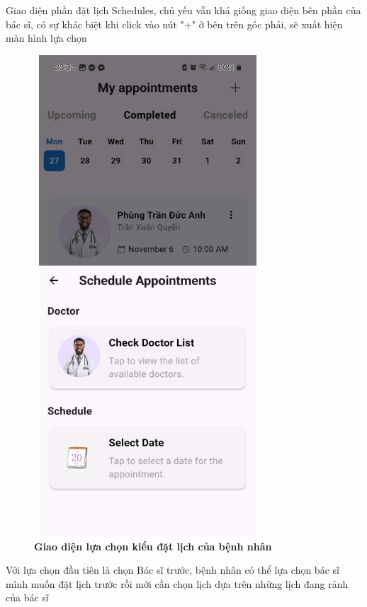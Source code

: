 	Giao diện phần đặt lịch Schedules, chủ yếu vẫn khá giống giao diện bên phần của bác sĩ, có sự khác biệt khi click vào nút "+" ở bên trên góc phải, sẽ xuất hiện màn hình lựa chọn
\begin{figure}[H]
		\centering
		\includegraphics[width=8.5cm,height=18cm]{Images/AppUI/scheduleChoice.jpg}
		\caption[Giao diện lựa chọn kiểu đặt lịch cho bệnh nhân]{\bfseries \fontsize{12pt}{0pt}\selectfont Giao diện lựa chọn kiểu đặt lịch của bệnh nhân}
		\label{scheduleChoice}
\end{figure}
	Với lựa chọn đầu tiên là chọn Bác sĩ trước, bệnh nhân có thể lựa chọn bác sĩ mình muốn đặt lịch trước rồi mới cần chọn lịch dựa trên những lịch đang rảnh của bác sĩ

